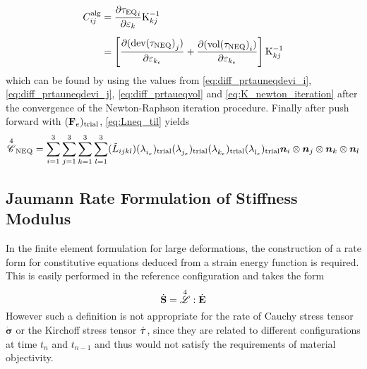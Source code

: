 \begin{align}
    \nonumber C^{\text{alg}}_{ij} 
    &= \pdv{{{\tau}_{\text{EQ}}}_{i}}{\varepsilon_{{k}}} \mathrm{K}^{-1}_{kj}\\[0.5em]
    &=  \left[ \pdv{({\text{dev}({\tau}_{\text{NEQ}})}_{j})}{\varepsilon_{{k}_e}} + \pdv{({\text{vol}({\tau}_{\text{NEQ}})}_{i})}{\varepsilon_{{k}_e}} \right] \mathrm{K}^{-1}_{kj}
    \label{eq:C_alg}
\end{align}
which can be found by using the values from \cref{eq:diff_prtauneqdevi_i}, \cref{eq:diff_prtauneqdevi_j}, \cref{eq:diff_prtaueqvol} and \cref{eq:K_newton_iteration} after the convergence of the Newton-Raphson iteration procedure.
Finally after push forward with \(({\mathbf{F}_{e}})_\text{trial}\), \cref{eq:Lneq_til} yields
\begin{equation}
    {\overset{4}{\mathscr{C}}}_{\text{NEQ}} = \sum_{i=1}^{3}\sum_{j=1}^{3}\sum_{k=1}^{3}\sum_{l=1}^{3} (\tilde{L}_{ijkl}) ({\lambda^{}_{{i}_e}})_\text{trial} ({\lambda^{}_{{j}_e}})_\text{trial} ({\lambda^{}_{{k}_e}})_\text{trial} ({\lambda^{}_{{l}_e}})_\text{trial} \bm{n}_{i} \otimes \bm{n}_{j}  \otimes \bm{n}_{k}\otimes \bm{n}_{l}
    \label{eq:Cmatneq}
\end{equation}

\subsection{Jaumann Rate Formulation of Stiffness Modulus}
In the finite element formulation for large deformations, the construction of a rate form for constitutive equations deduced from a strain energy function is required. This is easily performed in the reference configuration and takes the form
\begin{equation}
    \dot{\mathbf{S}} = \overset{4}{\mathscr{L}} : \dot{\mathbf{E}}
    \label{eq:constitutive_rate_form_material}
\end{equation}
However such a definition is not appropriate for the rate of Cauchy stress tensor \(\dot{\bm{\sigma}}\) or the Kirchoff stress tensor \(\dot{\bm{\tau}}\), since they are related to different configurations at time \(t_{n}\) and \(t_{n-1}\) and thus would not satisfy the requirements of material objectivity. 

